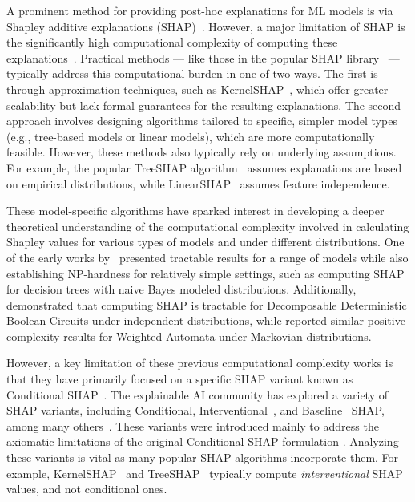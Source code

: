 

A prominent method for providing post-hoc explanations for ML models is via Shapley additive explanations (SHAP)~\citep{lundberg2017}. However, a major limitation of SHAP is the significantly high computational complexity of computing these explanations~\citep{bertossi2020causality}. Practical methods --- like those in the popular SHAP library~\citep{lundberg2017} --- typically address this computational burden in one of two ways. The first is through approximation techniques, such as KernelSHAP~\citep{lundberg2017}, which offer greater scalability but lack formal guarantees for the resulting explanations. The second approach involves designing algorithms tailored to specific, simpler model types (e.g., tree-based models or linear models), which are more computationally feasible. However, these methods also typically rely on underlying assumptions. For example, the popular TreeSHAP algorithm~\citep{lundbergnature} assumes explanations are based on empirical distributions, while LinearSHAP~\citep{lundberg2017} assumes feature independence.

These model-specific algorithms have sparked interest in developing a deeper theoretical understanding of the computational complexity involved in calculating Shapley values for various types of models and under different distributions. One of the early works by~\cite{vander21} presented tractable results for a range of models while also establishing NP-hardness for relatively simple settings, such as computing SHAP for decision trees with naive Bayes modeled distributions. Additionally,~\cite{arenas23} demonstrated that computing SHAP is tractable for Decomposable Deterministic Boolean Circuits under independent distributions, while \cite{marzouk24a} reported similar positive complexity results for Weighted Automata under Markovian distributions.

{\renewcommand{\thefootnote}{}%
}


However, a key limitation of these previous computational complexity works is that they have primarily focused on a specific SHAP variant known as Conditional SHAP~\citep{sundararajan20b}. The explainable AI community has explored a variety of SHAP variants, including Conditional, Interventional~\citep{janzing20a}, and Baseline~\citep{sundararajan20b} SHAP, among many others~\citep{frye20, albini22}. These variants were introduced mainly to address the axiomatic limitations of the original Conditional SHAP formulation \citep{sundararajan20b, Huang2023TheIO}. Analyzing these variants is vital as many popular SHAP algorithms incorporate them. For example, KernelSHAP~\citep{lundberg2017} and TreeSHAP~\citep{lundbergnature} typically compute \emph{interventional} SHAP values, and not conditional ones.


